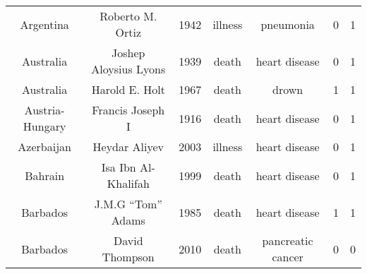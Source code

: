 \begin{center}
\begin{longtable}{ccccccc}
Argentina                                                                  & Roberto M. Ortiz                                                                      & 1942       & illness       & pneumonia                                                              & 0        & 1       \\
Australia                                                                  & Joshep Aloysius Lyons                                                                 & 1939       & death         & heart disease                                                          & 0        & 1       \\
Australia                                                                  & Harold E. Holt                                                                        & 1967       & death         & drown                                                                  & 1        & 1       \\
Austria-Hungary                                                            & Francis Joseph I                                                                      & 1916       & death         & heart disease                                                          & 0        & 1       \\
Azerbaijan                                                                 & Heydar Aliyev                                                                         & 2003       & illness       & heart disease                                                          & 0        & 1       \\
Bahrain                                                                    & Isa Ibn Al-Khalifah                                                                   & 1999       & death         & heart disease                                                          & 0        & 1       \\
Barbados                                                                   & J.M.G “Tom” Adams                                                                     & 1985       & death         & heart disease                                                          & 1        & 1       \\
Barbados                                                                   & David Thompson                                                                        & 2010       & death         & pancreatic cancer                                                      & 0        & 0       \\

\end{longtable}
\end{center}
